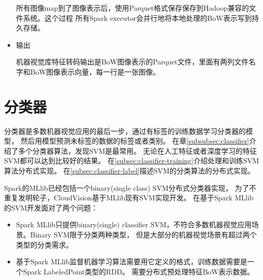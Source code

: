 \begin{itemize}
        所有图像map到了图像表示后，使用Parquet格式保存保存到Hadoop兼容的文件系统。这个过程
        所有Spark executor会并行地将本地处理的BoW表示写到持久存储。

      
  \item 输出

        机器视觉库特征转码输出是BoW图像表示的Parquet文件，里面有两列文件名字和BoW图像表示向量，每一行是一张图像。

\end{itemize}


\section{分类器}
\label{sec:cloudvision_classifier}
分类器是多数机器视觉应用的最后一步，通过有标签的训练数据学习分类器的模型，
然后用模型预测未标签的数据的标签或者类别。
在章\ref{subsubsec:classifier}介绍了多个分类器算法，发现SVM是最常用。
无论在人工特征或者深度学习的特征SVM都可以达到比较好的结果。
在\ref{subsec:classifier-training}介绍处理和训练SVM算法分布式实现。
在\ref{subsec:classifier-label}描述SVM的分类算法的分布式实现。


Spark的MLlib已经包括一个binary(single class) SVM分布式分类器实现，
为了不重复发明轮子，CloudVision基于MLlib现有SVM实现开发。
在基于Spark MLlib的SVM开发面对了两个问题：
\begin{itemize}
  \item Spark MLlib只提供binary(single) classifier SVM，不符合多数机器视觉应用场景。Binary SVM限于分类两种类型，
        但是大部分的机器视觉场景有超过两个类型的分类需求。
  \item 基于Spark MLlib监督机器学习算法需要用它定义的格式，训练数据需要是一个Spark LabeledPoint类型的RDD。
        需要分布式预处理特征BoW表示数据。
\end{itemize}

